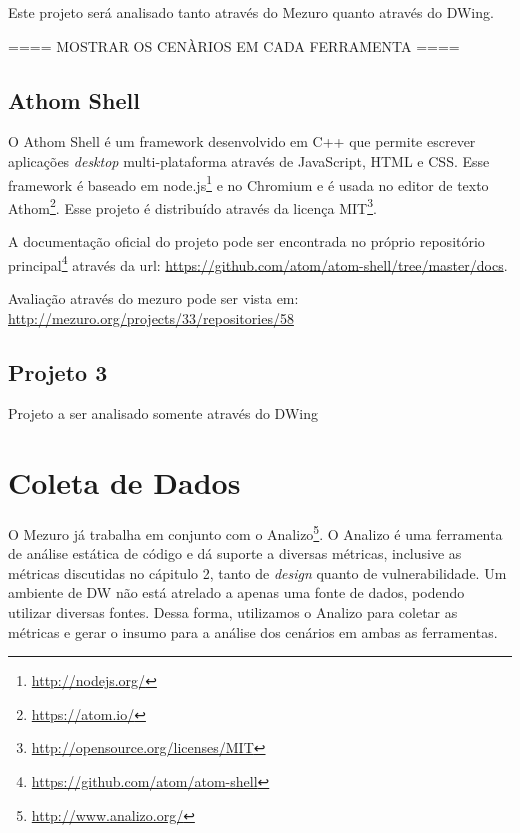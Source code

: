 Este projeto será analisado tanto através do Mezuro quanto através do DWing.


==== MOSTRAR OS CENÀRIOS EM CADA FERRAMENTA ====


\subsection{Athom Shell}
\label{section-athom}

O Athom Shell é um framework desenvolvido em C++ que permite escrever aplicações \emph{desktop} multi-plataforma através de JavaScript, HTML e CSS. Esse framework é baseado em node.js\footnote{\url{http://nodejs.org/}} e no Chromium e é usada no editor de texto Athom\footnote{\url{https://atom.io/}}. Esse projeto é distribuído através da licença MIT\footnote{\url{http://opensource.org/licenses/MIT}}.

A documentação oficial do projeto pode ser encontrada no próprio repositório principal\footnote{\url{https://github.com/atom/atom-shell}} através da url: \url{https://github.com/atom/atom-shell/tree/master/docs}.

Avaliação através do mezuro pode ser vista em: \url{http://mezuro.org/projects/33/repositories/58}

\subsection{Projeto 3}
\label{}

Projeto a ser analisado somente através do DWing


\section{Coleta de Dados}
\label{data-colect}

O Mezuro já trabalha em conjunto com o Analizo\footnote{\url{http://www.analizo.org/}}. O Analizo é uma ferramenta de análise estática de código e dá suporte a diversas métricas, inclusive as métricas discutidas no cápitulo 2, tanto de \emph{design} quanto de vulnerabilidade. Um ambiente de DW não está atrelado a apenas uma fonte de dados, podendo utilizar diversas fontes. Dessa forma, utilizamos o Analizo para coletar as métricas e gerar o insumo para a análise dos cenários em ambas as ferramentas.

